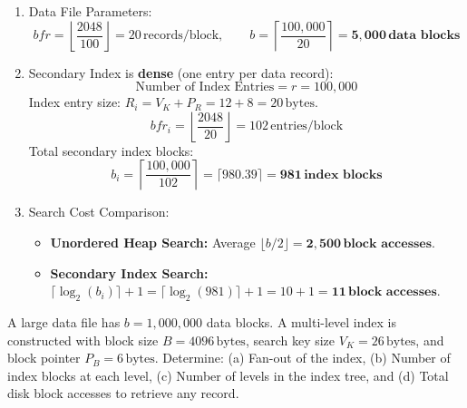 \documentclass[11pt,a4paper]{article}
\newenvironment{Problem}[1][Problem Scenario]{\begin{tcolorbox}[problembox, title=#1]}{\end{tcolorbox}}
\newenvironment{Solution}[1][Step-by-Step Solution]{\begin{tcolorbox}[solbox, title=#1]}{\end{tcolorbox}}
\begin{document}
\begin{Solution}
\begin{enumerate}
  \item Data File Parameters:
    \begin{equation*}
      bfr = \left\lfloor \frac{2048}{100} \right\rfloor = 20\,\text{records/block}, \qquad b = \left\lceil \frac{100,000}{20} \right\rceil = \mathbf{5,000\,\text{data blocks}}
    \end{equation*}
  \item Secondary Index is \textbf{dense} (one entry per data record):
    \begin{equation*}
      \text{Number of Index Entries} = r = 100,000
    \end{equation*}
    Index entry size: $R_i = V_K + P_R = 12 + 8 = 20\,\text{bytes}$.
    \begin{equation*}
      bfr_i = \left\lfloor \frac{2048}{20} \right\rfloor = 102\,\text{entries/block}
    \end{equation*}
    Total secondary index blocks:
    \begin{equation*}
      b_i = \left\lceil \frac{100,000}{102} \right\rceil = \lceil 980.39 \rceil = \mathbf{981\,\text{index blocks}}
    \end{equation*}
  \item Search Cost Comparison:
    \begin{itemize}
      \item \textbf{Unordered Heap Search:} Average $\lfloor b/2 \rfloor = \mathbf{2,500\,\text{block accesses}}$.
      \item \textbf{Secondary Index Search:} $\lceil \log_2(b_i) \rceil + 1 = \lceil \log_2(981) \rceil + 1 = 10 + 1 = \mathbf{11\,\text{block accesses}}$.
    \end{itemize}
\end{enumerate}
\end{Solution}

\begin{Problem}[Problem 4: Multi-Level Index Access Cost]
A large data file has $b = 1,000,000$ data blocks. A multi-level index is constructed with block size $B = 4096\,\text{bytes}$, search key size $V_K = 26\,\text{bytes}$, and block pointer $P_B = 6\,\text{bytes}$. Determine: (a) Fan-out of the index, (b) Number of index blocks at each level, (c) Number of levels in the index tree, and (d) Total disk block accesses to retrieve any record.
\end{Problem}
\end{document}
